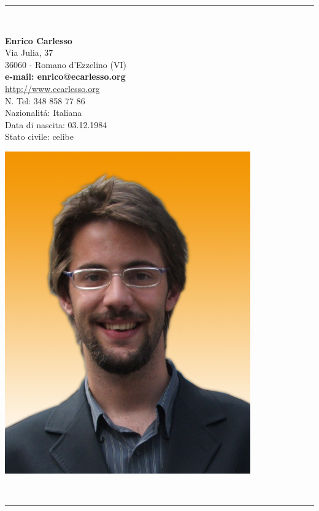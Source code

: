\documentclass[pdftex, a4paper, 11pt]{article}
\begin{document}
\vspace*{.3cm}
\begin{center}
  \rule{.8\textwidth}{1pt}\\[10pt]
  \begin{minipage}{.55\textwidth}
    \LARGE\textbf{Enrico Carlesso}\\[13pt]
    \small Via Julia, 37\\
    36060 - Romano d'Ezzelino (VI)\\[6pt]
    \textbf{e-mail: enrico@ecarlesso.org}\\
    \small \url{http://www.ecarlesso.org}\\
    \small N. Tel: 348 858 77 86\\[6pt]
    \small Nazionalit\'a: Italiana\\
    \small Data di nascita: 03.12.1984\\
    \small Stato civile: celibe\\
  \end{minipage}
  \begin{minipage}{.2\textwidth}
    \includegraphics[width=\textwidth]{foto.png}
  \end{minipage}\\[5pt]
  \rule{.8\textwidth}{1pt}
\end{center}
\vspace*{1cm}
\end{document}
